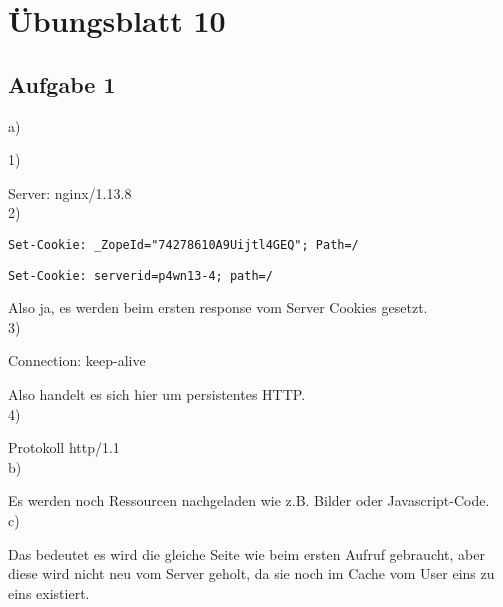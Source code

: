 \documentclass[12pt,a4paper,headsepline]{scrreprt}
\begin{document}


\section*{Übungsblatt 10}

\subsection*{Aufgabe 1}

a)

1)

Server: nginx/1.13.8
\\

2)

\verb|Set-Cookie: _ZopeId="74278610A9Uijtl4GEQ"; Path=/|

\verb|Set-Cookie: serverid=p4wn13-4; path=/|

Also ja, es werden beim ersten response vom Server Cookies gesetzt.
\\

3)

Connection: keep-alive 

Also handelt es sich hier um persistentes HTTP.
\\

4)

Protokoll http/1.1
\\

b)

Es werden noch Ressourcen nachgeladen wie z.B. Bilder oder Javascript-Code.
\\

c)

Das bedeutet es wird die gleiche Seite wie beim ersten Aufruf gebraucht, aber diese wird nicht neu vom Server geholt, da sie noch im Cache vom User eins zu eins existiert.
\end{document}
